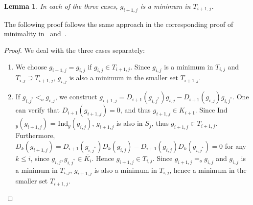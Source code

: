 \documentclass[11pt,onecolumn,draftcls]{IEEEtran}
\newtheorem{lemma}{Lemma}
\begin{document}
\begin{lemma} \label{lemma: GIminimum}
In each of the three cases, $g_{i+1, j}$ is a minimum in $T_{i+1, j}$.
\end{lemma}
The following proof follows the same approach in the corresponding proof of minimality in~\cite{McEliece03} and~\cite{WangMcEliece05}.
\begin{proof}
We deal with the three cases separately:
\begin{enumerate}
\item We choose $g_{i+1, j} = g_{i,j}$ if $g_{i,j} \in T_{i+1, j}$. Since $g_{i,j}$ is a minimum in $T_{i,j}$ and $T_{i, j} \supseteq T_{i+1,j}$, $g_{i,j}$ is also a minimum in the smaller set $T_{i+1,j}$.
\item If $g_{i, j^*} <_o g_{i,j}$, we construct $g_{i+1, j} = D_{i+1}(g_{i,j^*}) g_{i,j} - D_{i+1}(g_{i,j}) g_{i,j^*}$. One can verify that $D_{i+1}(g_{i+1, j}) = 0$, and thus $g_{i+1,j} \in K_{i+1}$. Since Ind$_y (g_{i+1, j})$ = Ind$_y (g_{i, j})$, $g_{i+1, j}$ is also in $S_j$, thus $g_{i+1, j} \in T_{i+1, j}$.  Furthermore, $D_k(g_{i+1, j}) = D_{i+1}(g_{i,j^*}) D_k(g_{i,j}) - D_{i+1}(g_{i,j}) D_k(g_{i,j^*}) = 0$ for any $k \le i$, since $g_{i,j}, g_{i, j^*} \in \overline{K_i}$. Hence $g_{i+1, j} \in T_{i, j}$. Since $g_{i+1, j} =_o g_{i, j}$ and $g_{i, j}$ is a minimum in $T_{i, j}$, $g_{i+1, j}$ is also a minimum in $T_{i, j}$, hence a minimum in the smaller set $T_{i+1, j}$.


\end{enumerate}
\end{proof}
\end{document}
